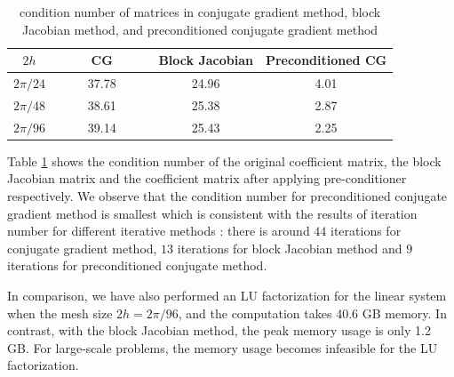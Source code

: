 \begin{table}[htbp]
	\begin{center}
		\begin{tabular}{|c|c c c|}
			\hline
			$2h$   & ~~~~ CG ~~~~& Block Jacobian & Preconditioned CG  \\
			\hline
			$2\pi/24$ &37.78& 24.96& 4.01\\
			\hline
			$2\pi/48$ &38.61 & 25.38 & 2.87\\
			\hline 
			$2\pi/96$ &39.14 &25.43 & 2.25\\
			\hline
		\end{tabular}
	\end{center}
	\caption{condition number of matrices in conjugate gradient method, block Jacobian method, and preconditioned conjugate gradient method}\label{condition_number}
\end{table} 
Table \ref{condition_number} shows the condition number of the original coefficient matrix, the block Jacobian matrix and the coefficient matrix after applying pre-conditioner respectively. We observe that the condition number for preconditioned conjugate gradient method is smallest which is consistent with the results of iteration number for different iterative methods : there is around $44$ iterations for conjugate gradient method, $13$ iterations for block Jacobian method and $9$ iterations for preconditioned conjugate method.

In comparison, we have also performed an LU factorization for the linear system when the mesh size $2h = 2\pi/96$, and the computation takes 40.6 GB memory. In contrast, with the block Jacobian method, the peak memory usage is only 1.2 GB. For large-scale problems, the memory usage becomes infeasible for the LU factorization. 

